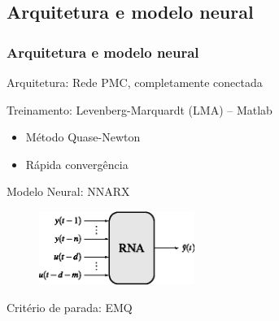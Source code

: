 \documentclass{beamer}
\begin{document}
\subsection{Arquitetura e modelo neural}
\begin{frame}
    \frametitle{Arquitetura e modelo neural}

    Arquitetura: Rede PMC, completamente conectada

    \vspace{0.25cm}

    Treinamento: Levenberg-Marquardt (LMA) -- Matlab\reg

\begin{itemize}
    \item Método Quase-Newton
    \item Rápida convergência
\end{itemize}

    Modelo Neural: NNARX
    
\begin{figure}[htb]
\centering
    \includegraphics[width=0.45\textwidth]{imgs/rnas/eps/nnarx}
\end{figure}

    \vspace{0.25cm}

    Critério de parada: EMQ

\end{frame}

\end{document}
